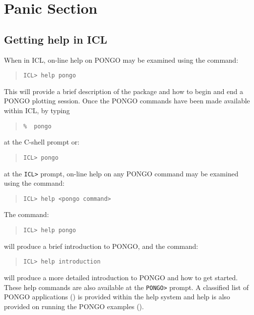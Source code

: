\section{Panic Section}

\subsection{Getting help in ICL}

When in ICL, on-line help on PONGO may be examined using the command:
\begin{quote}
\begin{verbatim}
ICL> help pongo
\end{verbatim}
\end{quote}
This will provide a brief description of the package and how to begin and end a
PONGO plotting session.
Once the PONGO commands have been made available within ICL, \ie by typing
\begin{quote}
\begin{verbatim}
%  pongo
\end{verbatim}
\end{quote}
at the C-shell prompt or:
\begin{quote}
\begin{verbatim}
ICL> pongo
\end{verbatim}
\end{quote}
at the \verb+ICL>+ prompt, on-line help on any PONGO command may be examined
using the command:
\begin{quote}
\begin{verbatim}
ICL> help <pongo command>
\end{verbatim}
\end{quote}
The command:
\begin{quote}
\begin{verbatim}
ICL> help pongo
\end{verbatim}
\end{quote}
will produce a brief introduction to PONGO, and the command:
\begin{quote}
\begin{verbatim}
ICL> help introduction
\end{verbatim}
\end{quote}
will produce a more detailed introduction to PONGO and how to get
started.  These help commands are also available at the \verb+PONGO>+
prompt.  A classified list of PONGO applications () is provided within the help system and help is also
provided on running the PONGO examples ().

